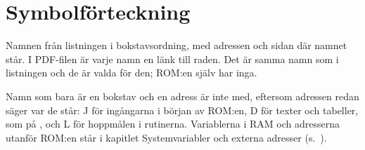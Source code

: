 
\chapter{Symbolförteckning}
\noindent Namnen från listningen i bokstavsordning, med adressen och
sidan där namnet står. I PDF-filen är varje namn en länk till raden. Det
är samma namn som i listningen och de är valda för den; ROM:en själv har
inga.
\par\smallskip\noindent Namn som bara är en bokstav och en adress är inte
med, eftersom adressen redan säger var de står: J för ingångarna i
början av ROM:en, D för texter och tabeller, som  på
, och L för hoppmålen i rutinerna. Variablerna i RAM och
adresserna utanför ROM:en står i kapitlet Systemvariabler och externa
adresser (s.~\pageref{kap:variabler}).
\par\medskip
